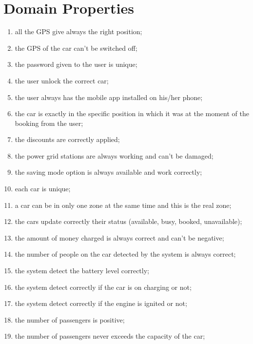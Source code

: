 \section{Domain Properties}
\begin{enumerate}
	\item all the GPS give always the right position;
	\item the GPS of the car can't be switched off;
	\item the password given to the user is unique;
	\item the user unlock the correct car;
	\item the user always has the mobile app installed on his/her phone;
	\item the car is exactly in the specific position in which it was at the moment of the booking from the user;
	\item the discounts are correctly applied;
	\item the power grid stations are always working and can't be damaged;
	\item the saving mode option is always available and work correctly;
	\item each car is unique;
	\item a car can be in only one zone at the same time and this is the real zone;
	\item the cars update correctly their status (available, busy, booked, unavailable);
    \item the amount of money charged is always correct and can't be negative;
    \item the number of people on the car detected by the system is always correct;
    \item the system detect the battery level correctly;
    \item the system detect correctly if the car is on charging or not;
    \item the system detect correctly if the engine is ignited or not;
    \item the number of passengers is positive;
    \item the number of passengers never exceeds the capacity of the car;

    
  
   
    
\end{enumerate}
